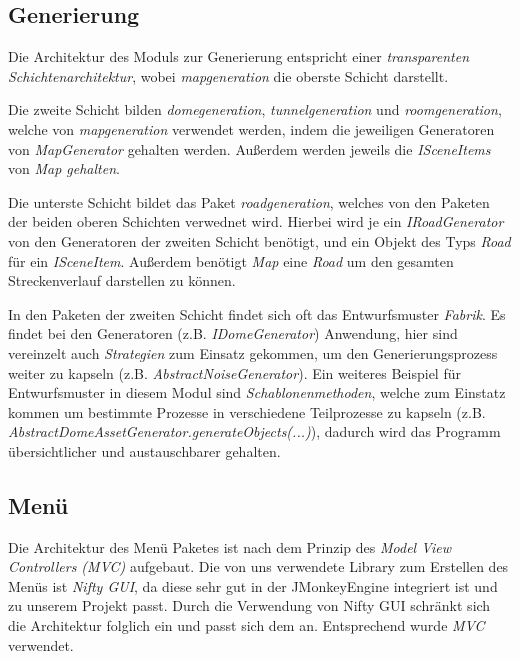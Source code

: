 \documentclass[parskip=full]{scrartcl}
\begin{document}
	\subsection{Generierung}
		Die Architektur des Moduls zur Generierung entspricht einer \textit{transparenten Schichtenarchitektur}, wobei 
		\textit{mapgeneration} die oberste Schicht darstellt.\par
		Die zweite Schicht bilden \textit{domegeneration}, 
		\textit{tunnelgeneration} und \textit{roomgeneration}, welche von \textit{mapgeneration} verwendet werden, indem 
		die jeweiligen Generatoren von \textit{MapGenerator} gehalten werden. 
		Außerdem werden jeweils die \textit{ISceneItems} von \textit{Map gehalten}.\par
		Die unterste Schicht bildet das Paket \textit{roadgeneration}, welches von den Paketen der beiden oberen 
		Schichten verwednet wird. Hierbei wird je ein \textit{IRoadGenerator} von den Generatoren der zweiten Schicht 
		benötigt, und ein Objekt des Typs \textit{Road} für ein \textit{ISceneItem}. Außerdem benötigt \textit{Map} 
		eine \textit{Road} um den gesamten Streckenverlauf darstellen zu können.\par

		In den Paketen der zweiten Schicht findet sich oft das Entwurfsmuster \textit{Fabrik}. Es findet bei den 
		Generatoren (z.B. \textit{IDomeGenerator}) Anwendung, hier sind vereinzelt auch \textit{Strategien} zum Einsatz 
		gekommen, um den Generierungsprozess weiter zu kapseln (z.B. \textit{AbstractNoiseGenerator}). Ein weiteres Beispiel 
		für Entwurfsmuster in diesem Modul sind \textit{Schablonenmethoden}, welche zum Einstatz kommen um bestimmte Prozesse 
		in verschiedene Teilprozesse zu kapseln (z.B. \textit{AbstractDomeAssetGenerator.generateObjects(...)}), 
		dadurch wird das Programm übersichtlicher und austauschbarer gehalten.


	\pagebreak

	\subsection{Menü} \par
		Die Architektur des Menü Paketes ist nach dem Prinzip des 
		\textit{Model View Controllers (MVC)} aufgebaut.
		Die von uns verwendete Library zum Erstellen des Menüs ist \textit{Nifty GUI}, da diese 
		sehr gut in der JMonkeyEngine integriert ist und zu unserem Projekt passt.
		Durch die Verwendung von Nifty GUI schränkt sich die Architektur folglich ein und passt 
		sich dem an. Entsprechend wurde \textit{MVC} verwendet.
\end{document}

